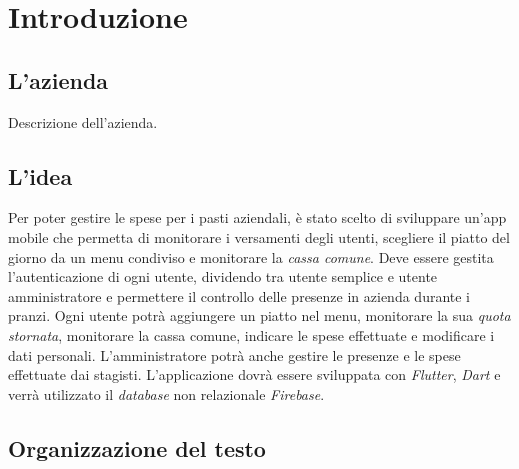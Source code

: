 \chapter{Introduzione}
\label{cap:introduzione}

%
%
%

\section{L'azienda}

Descrizione dell'azienda.

\section{L'idea}

Per poter gestire le spese per i pasti aziendali, è stato scelto di sviluppare un'app mobile che permetta di monitorare i versamenti degli utenti, scegliere il piatto del giorno da un menu condiviso e monitorare la \emph{cassa comune}.\newline
Deve essere gestita l'autenticazione di ogni utente, dividendo tra utente semplice e utente amministratore e permettere il controllo delle presenze in azienda durante i pranzi. \newline
Ogni utente potrà aggiungere un piatto nel menu, monitorare la sua \emph{quota stornata}\glsfirstoccur, monitorare la cassa comune, indicare le spese effettuate e modificare i dati personali. \newline
L'amministratore potrà anche gestire le presenze e le spese effettuate dai stagisti.
L'applicazione dovrà essere sviluppata con \textit{Flutter}, \textit{Dart} e verrà utilizzato il \textit{database} non relazionale \textit{Firebase}.


\section{Organizzazione del testo}


